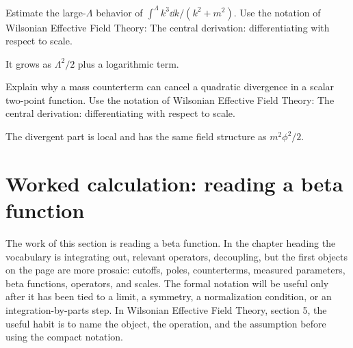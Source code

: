 \begin{exercise}
Estimate the large-\(\Lambda\) behavior of \(\int^\Lambda k^3\dd k/(k^2+m^2)\).  Use the notation of Wilsonian Effective Field Theory: The central derivation: differentiating with respect to scale.
\begin{answer}
It grows as \(\Lambda^2/2\) plus a logarithmic term.
\end{answer}
\end{exercise}

\begin{exercise}
Explain why a mass counterterm can cancel a quadratic divergence in a scalar two-point function.  Use the notation of Wilsonian Effective Field Theory: The central derivation: differentiating with respect to scale.
\begin{answer}
The divergent part is local and has the same field structure as \(m^2\phi^2/2\).
\end{answer}
\end{exercise}



\section{Worked calculation: reading a beta function}













The work of this section is reading a beta function.  In the chapter heading the vocabulary is integrating out, relevant operators, decoupling, but the first objects on the page are more prosaic: cutoffs, poles, counterterms, measured parameters, beta functions, operators, and scales.  The formal notation will be useful only after it has been tied to a limit, a symmetry, a normalization condition, or an integration-by-parts step.  In Wilsonian Effective Field Theory, section 5, the useful habit is to name the object, the operation, and the assumption before using the compact notation.

